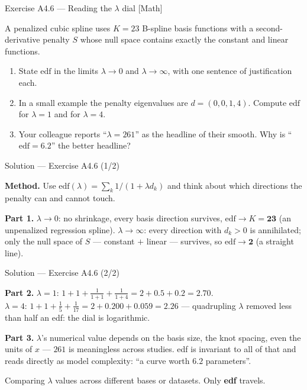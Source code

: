 \documentclass[aspectratio=169,11pt]{beamer}
\begin{document}
\begin{frame}{Exercise A4.6 --- Reading the $\lambda$ dial [Math]}
\begin{exercise}
  A penalized cubic spline uses $K = 23$ B-spline basis functions with a
  second-derivative penalty $S$ whose null space contains exactly the constant and
  linear functions.
  \begin{enumerate}
    \item State $\text{edf}$ in the limits $\lambda \to 0$ and $\lambda \to \infty$,
          with one sentence of justification each.
    \item In a small example the penalty eigenvalues are $d = (0, 0, 1, 4)$. Compute
          $\text{edf}$ for $\lambda = 1$ and for $\lambda = 4$.
    \item Your colleague reports ``$\lambda = 261$'' as the headline of their smooth.
          Why is ``$\text{edf} = 6.2$'' the better headline?
  \end{enumerate}
\end{exercise}
\end{frame}

\begin{frame}{Solution --- Exercise A4.6 (1/2)}
\begin{solutionbox}
  \textbf{Method.} Use $\text{edf}(\lambda) = \sum_k 1/(1+\lambda d_k)$ and think about
  which directions the penalty can and cannot touch.

  \textbf{Part 1.} $\lambda \to 0$: no shrinkage, every basis direction survives,
  $\text{edf} \to K = \mathbf{23}$ (an unpenalized regression spline).
  $\lambda \to \infty$: every direction with $d_k > 0$ is annihilated; only the
  null space of $S$ --- constant $+$ linear --- survives, so
  $\text{edf} \to \mathbf{2}$ (a straight line).
\end{solutionbox}
\end{frame}

\begin{frame}{Solution --- Exercise A4.6 (2/2)}
\begin{solutionbox}
  \textbf{Part 2.} $\lambda = 1$:
  $1 + 1 + \tfrac{1}{1+1} + \tfrac{1}{1+4} = 2 + 0.5 + 0.2 = \mathbf{2.70}$.\\
  $\lambda = 4$:
  $1 + 1 + \tfrac{1}{5} + \tfrac{1}{17} = 2 + 0.200 + 0.059 = \mathbf{2.26}$ ---
  quadrupling $\lambda$ removed less than half an edf: the dial is logarithmic.

  \textbf{Part 3.} $\lambda$'s numerical value depends on the basis size, the knot
  spacing, even the units of $x$ --- $261$ is meaningless across studies. edf is
  invariant to all of that and reads directly as model complexity:
  ``a curve worth $6.2$ parameters''.
\end{solutionbox}
\begin{mistake}
  Comparing $\lambda$ values across different bases or datasets. Only \textbf{edf}
  travels.
\end{mistake}
\end{frame}
\end{document}

